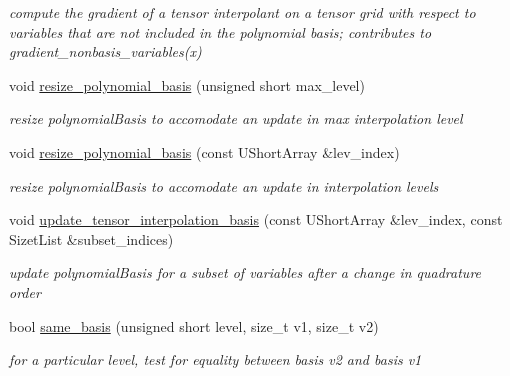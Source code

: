 \begin{DoxyCompactItemize}
\begin{DoxyCompactList}\small\item\em compute the gradient of a tensor interpolant on a tensor grid with respect to variables that are not included in the polynomial basis; contributes to gradient\+\_\+nonbasis\+\_\+variables(x) \end{DoxyCompactList}\item 
void \hyperlink{classPecos_1_1SharedInterpPolyApproxData_a0c16024e7c4a723a86a91325384061b0}{resize\+\_\+polynomial\+\_\+basis} (unsigned short max\+\_\+level)\label{classPecos_1_1SharedInterpPolyApproxData_a0c16024e7c4a723a86a91325384061b0}

\begin{DoxyCompactList}\small\item\em resize polynomial\+Basis to accomodate an update in max interpolation level \end{DoxyCompactList}\item 
void \hyperlink{classPecos_1_1SharedInterpPolyApproxData_a3ffa30ce4a1fc0da8012f7b440ffd9d0}{resize\+\_\+polynomial\+\_\+basis} (const U\+Short\+Array \&lev\+\_\+index)\label{classPecos_1_1SharedInterpPolyApproxData_a3ffa30ce4a1fc0da8012f7b440ffd9d0}

\begin{DoxyCompactList}\small\item\em resize polynomial\+Basis to accomodate an update in interpolation levels \end{DoxyCompactList}\item 
void \hyperlink{classPecos_1_1SharedInterpPolyApproxData_a4bdd4b14c446ea5d1f97acf9aebe90b5}{update\+\_\+tensor\+\_\+interpolation\+\_\+basis} (const U\+Short\+Array \&lev\+\_\+index, const Sizet\+List \&subset\+\_\+indices)\label{classPecos_1_1SharedInterpPolyApproxData_a4bdd4b14c446ea5d1f97acf9aebe90b5}

\begin{DoxyCompactList}\small\item\em update polynomial\+Basis for a subset of variables after a change in quadrature order \end{DoxyCompactList}\item 
bool \hyperlink{classPecos_1_1SharedInterpPolyApproxData_ab3d29fe58f1951dbed35555f68a934e7}{same\+\_\+basis} (unsigned short level, size\+\_\+t v1, size\+\_\+t v2)\label{classPecos_1_1SharedInterpPolyApproxData_ab3d29fe58f1951dbed35555f68a934e7}

\begin{DoxyCompactList}\small\item\em for a particular level, test for equality between basis v2 and basis v1 \end{DoxyCompactList}\end{DoxyCompactItemize}
